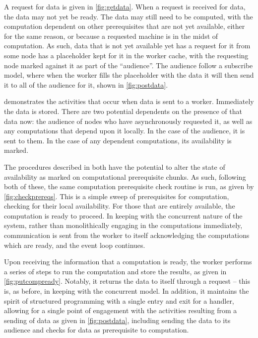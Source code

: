 
A request for data is given in \cref{fig:getdata}.
When a request is received for data, the data may not yet be ready.
The data may still need to be computed, with the computation dependent on other prerequisites that are not yet available, either for the same reason, or because a requested machine is in the midst of computation.
As such, data that is not yet available yet has a request for it from some node has a placeholder kept for it in the worker cache, with the requesting node marked against it as part of the ``audience''.
The audience follow a subscribe model, where when the worker fills the placeholder with the data it will then send it to all of the audience for it, shown in \cref{fig:postdata}.


 demonstrates the activities that occur when data is sent to a worker.
Immediately the data is stored.
There are two potential dependents on the presence of that data now: the audience of nodes who have asynchronously requested it, as well as any computations that depend upon it locally.
In the case of the audience, it is sent to them.
In the case of any dependent computations, its availability is marked.


The procedures described in  both have the potential to alter the state of availability as marked on computational prerequisite chunks.
As such, following both of these, the same computation prerequisite check routine is run, as given by \cref{fig:checkprereqs}.
This is a simple sweep of prerequisites for computation, checking for their local availability.
For those that are entirely available, the computation is ready to proceed.
In keeping with the concurrent nature of the system, rather than monolithically engaging in the computations immediately, communication is sent from the worker to itself acknowledging the computations which are ready, and the event loop continues.


Upon receiving the information that a computation is ready, the worker performs a series of steps to run the computation and store the results, as given in \cref{fig:putcompready}.
Notably, it returns the data to itself through a request -- this is, as before, in keeping with the concurrent model.
In addition, it maintains the spirit of structured programming with a single entry and exit for a handler, allowing for a single point of engagement with the activities resulting from a sending of data as given in \cref{fig:postdata}, including sending the data to its audience and checks for data as prerequisite to computation.


